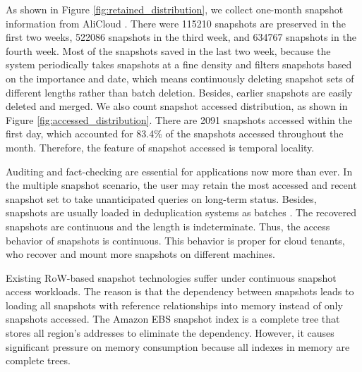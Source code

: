 \documentclass[sigconf, nonacm]{acmart}
\begin{document}
As shown in Figure \ref{fig:retained_distribution}, we collect one-month snapshot information from AliCloud \cite{alibackupset}. There were 115210 snapshots are preserved in the first two weeks, 522086 snapshots in the third week, and 634767 snapshots in the fourth week. Most of the snapshots saved in the last two week, because the system periodically takes snapshots at a fine density and filters snapshots based on the importance and date, which means continuously deleting snapshot sets of different lengths rather than batch deletion. 
Besides, earlier snapshots are easily deleted and merged.
We also count snapshot accessed distribution, as shown in Figure \ref{fig:accessed_distribution}. There are 2091 snapshots accessed within the first day, which accounted for 83.4\% of the snapshots accessed throughout the month. Therefore, the feature of snapshot accessed is temporal locality.


Auditing and fact-checking \cite{jo2019aggchecker,shaull2008skippy} are essential for applications now more than ever. 
In the multiple snapshot scenario, the user may retain the most accessed and recent snapshot set \cite{vrable2009cumulus} to take unanticipated queries on long-term status.
Besides, snapshots are usually loaded in deduplication systems as batches \cite{ren2021accelerating,zou2021dilemma}.
The recovered snapshots are continuous and the length is indeterminate.
Thus, the access behavior of snapshots is continuous. This behavior is proper for cloud tenants, who recover and mount  more snapshots on different machines.


Existing RoW-based snapshot technologies suffer under continuous snapshot access workloads. The reason is that the dependency between snapshots leads to loading all snapshots with reference relationships into memory instead of only snapshots accessed. The Amazon EBS snapshot index is a complete tree that stores all region's addresses to eliminate the dependency. However, it causes significant pressure on memory consumption because all indexes in memory are complete trees.

\end{document}
